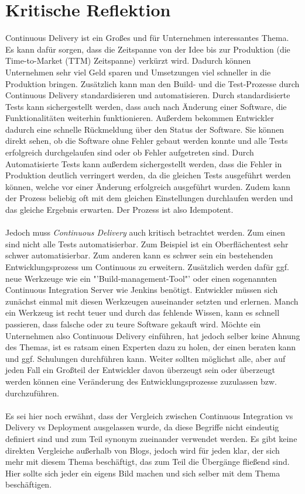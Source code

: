 \section{Kritische Reflektion}
\label{sec:kritischeRelfektion}
Continuous Delivery ist ein Großes und für Unternehmen interessantes Thema. Es kann dafür sorgen, dass die Zeitspanne von der Idee bis zur Produktion (die Time-to-Market (TTM) Zeitspanne) verkürzt wird. Dadurch können Unternehmen sehr viel Geld sparen und Umsetzungen viel schneller in die Produktion bringen. Zusätzlich kann man den Build- und die Test-Prozesse durch Continuous Delivery standardisieren und automatisieren. Durch standardisierte Tests kann sichergestellt werden, dass auch nach Änderung einer Software, die Funktionalitäten weiterhin funktionieren. Außerdem bekommen Entwickler dadurch eine schnelle Rückmeldung über den Status der Software. Sie können direkt sehen, ob die Software ohne Fehler gebaut werden konnte und alle Tests erfolgreich durchgelaufen sind oder ob Fehler aufgetreten sind. Durch Automatisierte Tests kann außerdem sichergestellt werden, dass die Fehler in Produktion deutlich verringert werden, da die gleichen Tests ausgeführt werden können, welche vor einer Änderung erfolgreich ausgeführt wurden. Zudem kann der Prozess beliebig oft mit dem gleichen Einstellungen durchlaufen werden und das gleiche Ergebnis erwarten. Der Prozess ist also Idempotent.
\\\\
Jedoch muss \textit{Continuous Delivery} auch kritisch betrachtet werden. Zum einen sind nicht alle Tests automatisierbar. Zum Beispiel ist ein Oberflächentest sehr schwer automatisierbar. Zum anderen kann es schwer sein ein bestehenden Entwicklungsprozess um Continuous zu erweitern. Zusätzlich werden dafür ggf. neue Werkzeuge wie ein "'Build-management-Tool"' oder einen sogenannten Continuous Integration Server wie Jenkins benötigt. Entwickler müssen sich zunächst einmal mit diesen Werkzeugen auseinander setzten und erlernen. Manch ein Werkzeug ist recht teuer und durch das fehlende Wissen, kann es schnell passieren, dass falsche oder zu teure Software gekauft wird. Möchte ein Unternehmen also Continuous Delivery einführen, hat jedoch selber keine Ahnung des Themas, ist es ratsam einen Experten dazu zu holen, der einen beraten kann und ggf. Schulungen durchführen kann. Weiter sollten möglichst alle, aber auf jeden Fall ein Großteil der Entwickler davon überzeugt sein oder überzeugt werden können eine Veränderung des Entwicklungsprozesse zuzulassen bzw. durchzuführen.
\\\\
Es sei hier noch erwähnt, dass der Vergleich zwischen Continuous Integration vs Delivery vs Deployment ausgelassen wurde, da diese Begriffe nicht eindeutig definiert sind und zum Teil synonym zueinander verwendet werden. Es gibt keine direkten Vergleiche außerhalb von Blogs, jedoch wird für jeden klar, der sich mehr mit diesem Thema beschäftigt, das zum Teil die Übergänge fließend sind. Hier sollte sich jeder ein eigens Bild machen und sich selber mit dem Thema beschäftigen.

